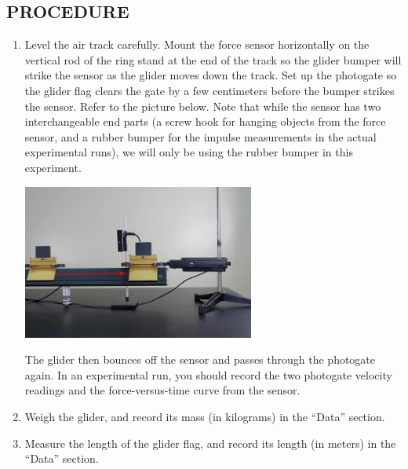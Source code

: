 \subsection*{PROCEDURE}

\begin{enumerate}[label=\arabic*.]

\item Level the air track carefully.  Mount the force sensor horizontally on the vertical rod of the ring stand at the end of the track so the glider bumper will strike the sensor as the glider moves down the track.  
Set up the photogate so the glider flag clears the gate by a few centimeters before the bumper strikes the sensor.  Refer to the picture below.
Note that while the sensor has two interchangeable end parts (a screw hook for
hanging objects from the force sensor, and a rubber bumper
for the impulse measurements in the actual experimental runs),
we will only be using the rubber bumper in this experiment.

\begin{center} \includegraphics*[width=0.6\textwidth]{imgs/6labs/6Alab/6Aexp5/gif_still.jpg} \end{center}
The glider then bounces off the sensor and passes through the photogate again.  In an experimental run, you should record the two photogate velocity readings and the force-versus-time curve from the sensor.

\item Weigh the glider, and record its mass (in kilograms) in the ``Data'' section.

\item Measure the length of the glider flag, and record its length (in meters) in the ``Data'' section.


\end{enumerate}
